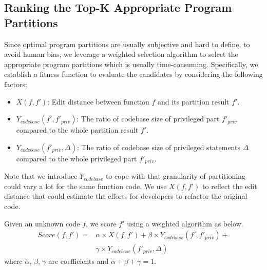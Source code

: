 \subsection{Ranking the Top-K Appropriate Program Partitions}
\label{sec:ranking}
Since optimal program partitions are usually subjective and hard to define,
to avoid human bias, we leverage a weighted selection algorithm to select the appropriate program partitions which is usually time-consuming.
{Specifically, we establish a fitness function to evaluate the candidates by considering the following factors:}
\begin{itemize}[leftmargin=.5cm]
\item $X(f, f')$: Edit distance between function $f$ and its partition result $f'$.
\item $Y_{codebase}(f', f'_{priv})$: The ratio of codebase size of privileged part $f'_{priv}$ compared to the whole partition result $f'$.
\item $Y_{codebase}(f'_{priv}, \Delta)$: The ratio of codebase size of privileged statements $\Delta$ compared to the whole privileged part $f'_{priv}$.
\end{itemize}
Note that we introduce $Y_{codebase}$ to cope with that granularity of partitioning could vary a lot for the same function code.
We use $X(f, f')$ to reflect the edit distance that could estimate the efforts for developers to refactor the original code.

Given an unknown code $f$, 
we score  $f'$ using a weighted algorithm as below.
 \begin{align}
 	Score(f, f') =& \alpha \times  X(f, f') + \beta \times  Y_{codebase}(f', f'_{priv}) + \nonumber\\
    &\gamma \times  Y_{codebase}(f'_{priv}, \Delta) \nonumber
 \end{align}
where $\alpha$, $\beta$, $\gamma$ are coefficients and $\alpha + \beta + \gamma = 1$.


